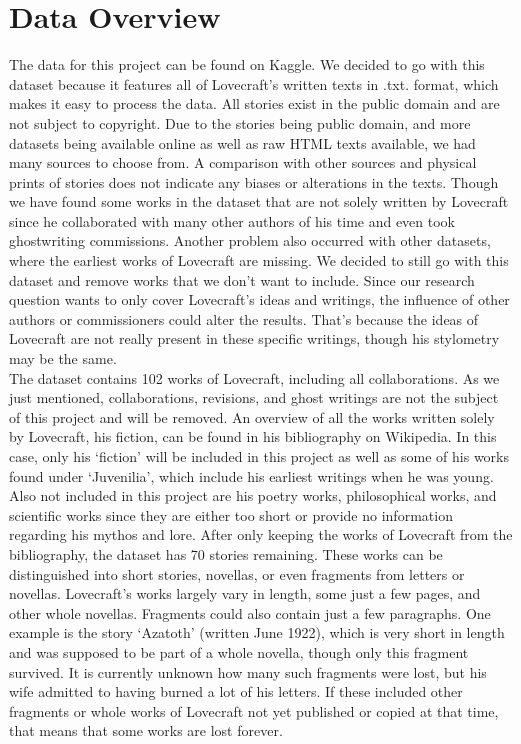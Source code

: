 \section{Data Overview}

The data for this project can be found on Kaggle. We decided to go with this dataset because it 
features all of Lovecraft’s written texts in .txt. format, which makes it easy to process the data. 
All stories exist in the public domain and are not subject to copyright. Due to the stories being 
public domain, and more datasets being available online as well as raw HTML texts available, we 
had many sources to choose from. A comparison with other sources and physical prints of stories 
does not indicate any biases or alterations in the texts. Though we have found some works in the 
dataset that are not solely written by Lovecraft since he collaborated with many other authors of 
his time and even took ghostwriting commissions. Another problem also occurred with other datasets, 
where the earliest works of Lovecraft are missing. We decided to still go with this dataset and 
remove works that we don’t want to include. Since our research question wants to only cover 
Lovecraft’s ideas and writings, the influence of other authors or commissioners could alter the 
results. That’s because the ideas of Lovecraft are not really present in these specific writings, 
though his stylometry may be the same.\\

The dataset contains 102 works of Lovecraft, including all collaborations. As we just mentioned, 
collaborations, revisions, and ghost writings are not the subject of this project and will be 
removed. An overview of all the works written solely by Lovecraft, his fiction, can be found in 
his bibliography on Wikipedia. In this case, only his ‘fiction’ will be included in this project 
as well as some of his works found under ‘Juvenilia’, which include his earliest writings when he 
was young. Also not included in this project are his poetry works, philosophical works, and 
scientific works since they are either too short or provide no information regarding his mythos 
and lore. After only keeping the works of Lovecraft from the bibliography, the dataset has 70 
stories remaining. These works can be distinguished into short stories, novellas, or even fragments 
from letters or novellas. Lovecraft’s works largely vary in length, some just a few pages, and 
other whole novellas. Fragments could also contain just a few paragraphs. One example is the 
story ‘Azatoth’ (written June 1922), which is very short in length and was supposed to be part 
of a whole novella, though only this fragment survived. It is currently unknown how many such 
fragments were lost, but his wife admitted to having burned a lot of his letters. If these included 
other fragments or whole works of Lovecraft not yet published or copied at that time, that means 
that some works are lost forever.\\

